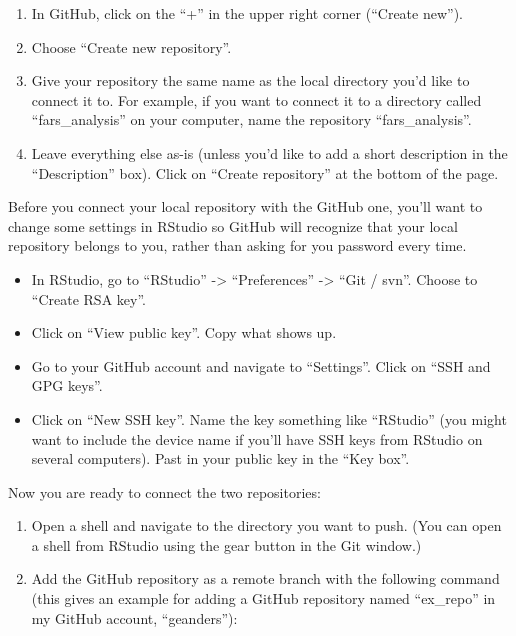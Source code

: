 \documentclass[]{tufte-book}
\providecommand{\tightlist}{%
  \setlength{\itemsep}{0pt}\setlength{\parskip}{0pt}}
\begin{document}
\begin{enumerate}
\def\labelenumi{\arabic{enumi}.}
\tightlist
\item
  In GitHub, click on the ``+'' in the upper right corner (``Create new'').
\item
  Choose ``Create new repository''.
\item
  Give your repository the same name as the local directory you'd like to
  connect it to. For example, if you want to connect it to a directory called
  ``fars\_analysis'' on your computer, name the repository ``fars\_analysis''.
\item
  Leave everything else as-is (unless you'd like to add a short description in
  the ``Description'' box). Click on ``Create repository'' at the bottom of the page.
\end{enumerate}

Before you connect your local repository with the GitHub one, you'll want to change
some settings in RStudio so GitHub will recognize that your local repository
belongs to you, rather than asking for you password every time.

\begin{itemize}
\tightlist
\item
  In RStudio, go to ``RStudio'' -\textgreater{} ``Preferences'' -\textgreater{} ``Git / svn''. Choose to ``Create
  RSA key''.
\item
  Click on ``View public key''. Copy what shows up.
\item
  Go to your GitHub account and navigate to ``Settings''. Click on ``SSH and GPG keys''.
\item
  Click on ``New SSH key''. Name the key something like ``RStudio'' (you might want
  to include the device name if you'll have SSH keys from RStudio on several
  computers). Past in your public key in the ``Key box''.
\end{itemize}

Now you are ready to connect the two repositories:

\begin{enumerate}
\def\labelenumi{\arabic{enumi}.}
\tightlist
\item
  Open a shell and navigate
  to the directory you want to push. (You can open a shell from RStudio using the
  gear button in the Git window.)
\item
  Add the GitHub repository as a remote branch
  with the following command (this gives an example for adding a GitHub repository
  named ``ex\_repo'' in my GitHub account, ``geanders''):
\end{enumerate}
\end{document}
